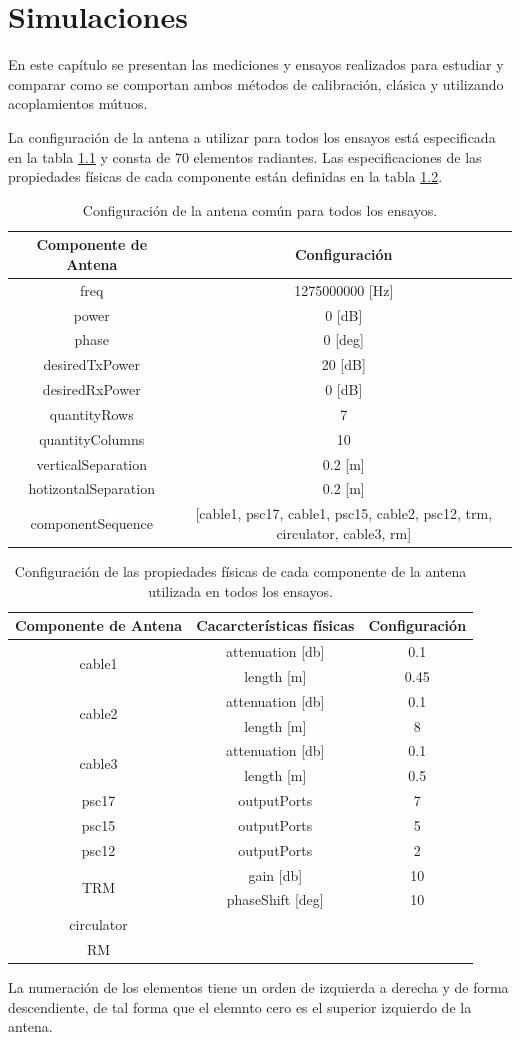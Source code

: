 \chapter{Simulaciones}

En este capítulo se presentan las mediciones y ensayos realizados para estudiar y comparar como se comportan ambos métodos de
calibración, clásica y utilizando acoplamientos mútuos.

La configuración de la antena a utilizar para todos los ensayos está especificada en la tabla \ref{tab:configurationUsed} y 
consta de 70 elementos radiantes. Las especificaciones de las propiedades físicas de cada componente están definidas en la 
tabla \ref{tab:configurationOfComponents}.
\begin{table}[H]
  \footnotesize
  \centering
  \begin{tabular}{|c|c|}
	\hline
	\textbf{Componente de Antena} & \textbf{Configuración} \tabularnewline \hline 
	freq &  1275000000 [Hz] \tabularnewline\hline 
	power & 0 [dB] \tabularnewline \hline 
	phase & 0 [deg] \tabularnewline \hline 
	desiredTxPower & 20 [dB] \tabularnewline \hline 
	desiredRxPower & 0 [dB] \tabularnewline \hline 
	quantityRows & 7 \tabularnewline \hline 
	quantityColumns & 10 \tabularnewline \hline 
	verticalSeparation & 0.2 [m] \tabularnewline \hline 
	hotizontalSeparation & 0.2 [m] \tabularnewline \hline 
	componentSequence & [cable1, psc17, cable1, psc15, cable2, psc12, trm, circulator, cable3, rm] \tabularnewline \hline 
  \end{tabular}
  \caption{Configuración de la antena común para todos los ensayos.}
  \label{tab:configurationUsed}
\end{table}
\begin{table}[H]
  \footnotesize
  \centering
  \begin{tabular}{|c|c|c|}
	\hline
	\textbf{Componente de Antena} & \textbf{Cacarcterísticas físicas} & \textbf{Configuración} \tabularnewline \hline 
	\multirow{2}{*}{cable1} &  attenuation [db] & 0.1\tabularnewline \cline{2-3}
	 & length [m] & 0.45\tabularnewline \hline 
	\multirow{2}{*}{cable2} &  attenuation [db] & 0.1\tabularnewline \cline{2-3}
	 & length [m] & 8\tabularnewline \hline 
	\multirow{2}{*}{cable3} &  attenuation [db] & 0.1\tabularnewline \cline{2-3}
	 & length [m] & 0.5\tabularnewline \hline 
	psc17 & outputPorts & 7\tabularnewline \hline
	psc15 & outputPorts & 5\tabularnewline \hline
	psc12 & outputPorts & 2\tabularnewline \hline
	\multirow{2}{*}{TRM} & gain [db] & 10\tabularnewline \cline{2-3}
	 & phaseShift [deg] & 10\tabularnewline \hline 
	circulator & & \tabularnewline \hline 
	RM & & \tabularnewline \hline 
  \end{tabular}
  \caption{Configuración de las propiedades físicas de cada componente de la antena utilizada en todos los ensayos.}
  \label{tab:configurationOfComponents}
\end{table}
La numeración de los elementos tiene un orden de izquierda a derecha y de forma descendiente, de tal forma que el elemnto cero 
es el superior izquierdo de la antena.


